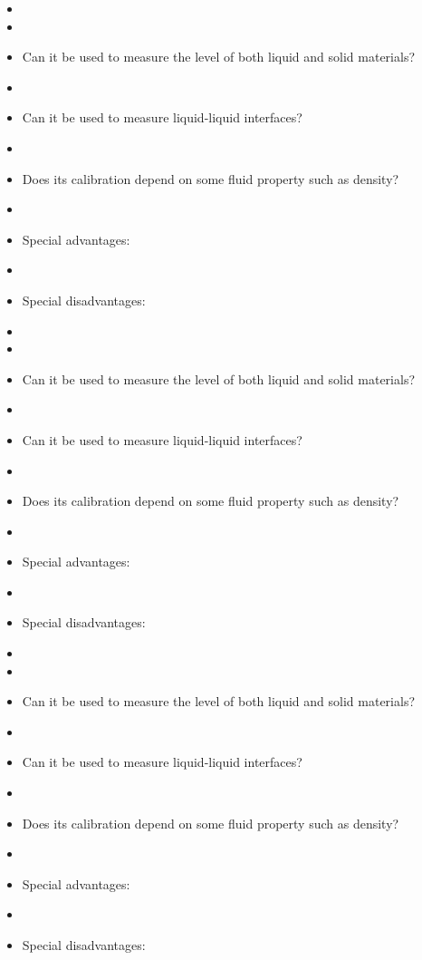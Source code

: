 \begin{itemize}
\goodbreak
\item{} 
\item\item{} Can it be used to measure the level of both liquid and solid materials?
\item\item{} Can it be used to measure liquid-liquid interfaces?
\item\item{} Does its calibration depend on some fluid property such as density?
\item\item{} Special advantages:
\item\item{} Special disadvantages:
\end{itemize}

\vskip 10pt

\begin{itemize}
\goodbreak
\item{} 
\item\item{} Can it be used to measure the level of both liquid and solid materials?
\item\item{} Can it be used to measure liquid-liquid interfaces?
\item\item{} Does its calibration depend on some fluid property such as density?
\item\item{} Special advantages:
\item\item{} Special disadvantages:
\end{itemize}

\vskip 10pt

\begin{itemize}
\goodbreak
\item{} 
\item\item{} Can it be used to measure the level of both liquid and solid materials?
\item\item{} Can it be used to measure liquid-liquid interfaces?
\item\item{} Does its calibration depend on some fluid property such as density?
\item\item{} Special advantages:
\item\item{} Special disadvantages:
\end{itemize}

